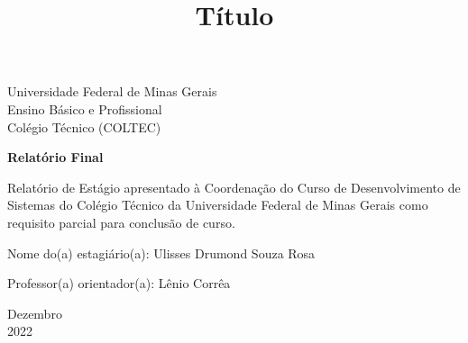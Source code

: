 \documentclass[12pt]{article}
\begin{document}

\begin{titlepage}
	\begin{center}
	

	    \large{Universidade Federal de Minas Gerais}\\
		\large{Ensino Básico e Profissional}\\ 
		\large{Colégio Técnico (COLTEC)}\\ 
\vspace{15pt}
        
        \vspace{85pt}
        
		\textbf{\LARGE{Relatório Final }}
		\title{\large{Título}}
			
	\end{center}
\vspace{1,5cm}
	
	\begin{flushright}

   \begin{list}{}{
      \setlength{\leftmargin}{4.5cm}
      \setlength{\rightmargin}{0cm}
      \setlength{\labelwidth}{0pt}
      \setlength{\labelsep}{\leftmargin}}

      \item Relatório de Estágio apresentado à Coordenação do Curso de Desenvolvimento de Sistemas do Colégio Técnico da Universidade Federal de Minas Gerais como requisito parcial para conclusão de curso.

      \begin{list}{}{
      \setlength{\leftmargin}{0cm}
      \setlength{\rightmargin}{0cm}
      \setlength{\labelwidth}{0pt}
      \setlength{\labelsep}{\leftmargin}}
			\item Nome do(a) estagiário(a): Ulisses Drumond Souza Rosa\
            \item Professor(a) orientador(a): Lênio Corrêa\

      \end{list}
   \end{list}
\end{flushright}
\vspace{1cm}
\begin{center}
		\vspace{\fill}
		 Dezembro\\
		 2022
			\end{center}
\end{titlepage}
\newpage
\newpage
\tableofcontents
\thispagestyle{empty}
\end{document}
